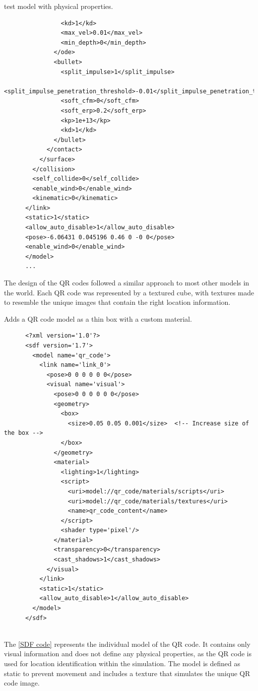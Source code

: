 \documentclass[../../main]{subfiles}
\begin{document}
\begin{codebox}[]{test model with physical properties.}
\begin{verbatim}
                <kd>1</kd>
                <max_vel>0.01</max_vel>
                <min_depth>0</min_depth>
              </ode>
              <bullet>
                <split_impulse>1</split_impulse>
                <split_impulse_penetration_threshold>-0.01</split_impulse_penetration_threshold>
                <soft_cfm>0</soft_cfm>
                <soft_erp>0.2</soft_erp>
                <kp>1e+13</kp>
                <kd>1</kd>
              </bullet>
            </contact>
          </surface>
        </collision>
        <self_collide>0</self_collide>
        <enable_wind>0</enable_wind>
        <kinematic>0</kinematic>
      </link>
      <static>1</static>
      <allow_auto_disable>1</allow_auto_disable>
      <pose>-6.06431 0.045196 0.46 0 -0 0</pose>
      <enable_wind>0</enable_wind>
      </model>
      ...
\end{verbatim}
\end{codebox}

The design of the QR codes followed a similar approach to most other models in the 
world. Each QR code was represented by a textured cube, with textures made to 
resemble the unique images that contain the right location information.
\newpage
\begin{codebox}[label=SDF code]{Adds a QR code model as a thin box with a custom material.}
  
  \begin{verbatim}
      <?xml version='1.0'?>
      <sdf version='1.7'>
        <model name='qr_code'>
          <link name='link_0'>
            <pose>0 0 0 0 0 0</pose>
            <visual name='visual'>
              <pose>0 0 0 0 0 0</pose>
              <geometry>
                <box>
                  <size>0.05 0.05 0.001</size>  <!-- Increase size of the box -->
                </box>
              </geometry>
              <material>
                <lighting>1</lighting>
                <script>
                  <uri>model://qr_code/materials/scripts</uri>
                  <uri>model://qr_code/materials/textures</uri>
                  <name>qr_code_content</name>
                </script>
                <shader type='pixel'/>
              </material>
              <transparency>0</transparency> 
              <cast_shadows>1</cast_shadows>
            </visual>
          </link>
          <static>1</static>
          <allow_auto_disable>1</allow_auto_disable>
        </model>
      </sdf>
    
    \end{verbatim}
  \end{codebox}
    \newpage
    The \cref{SDF code} represents the individual model of the QR code. It contains 
    only visual information and does not define any physical properties, as the QR 
    code is used for location identification within the simulation. The model is defined 
    as static to prevent movement and includes a texture that simulates the unique QR 
    code image.
\end{document}
